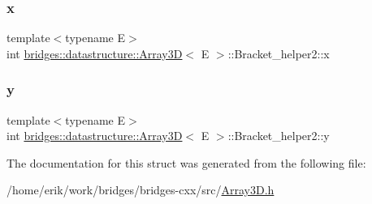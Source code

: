 \subsubsection{\texorpdfstring{x}{x}}
{\footnotesize\ttfamily template$<$typename E$>$ \\
int \hyperlink{classbridges_1_1datastructure_1_1_array3_d}{bridges\+::datastructure\+::\+Array3D}$<$ E $>$\+::Bracket\+\_\+helper2\+::x}

\mbox{\label{structbridges_1_1datastructure_1_1_array3_d_1_1_bracket__helper2_a2bd3e3e4253b14e14f1803b49d2f6dca}} 
\subsubsection{\texorpdfstring{y}{y}}
{\footnotesize\ttfamily template$<$typename E$>$ \\
int \hyperlink{classbridges_1_1datastructure_1_1_array3_d}{bridges\+::datastructure\+::\+Array3D}$<$ E $>$\+::Bracket\+\_\+helper2\+::y}



The documentation for this struct was generated from the following file\+:\begin{DoxyCompactItemize}
\item 
/home/erik/work/bridges/bridges-\/cxx/src/\hyperlink{_array3_d_8h}{Array3\+D.\+h}\end{DoxyCompactItemize}
